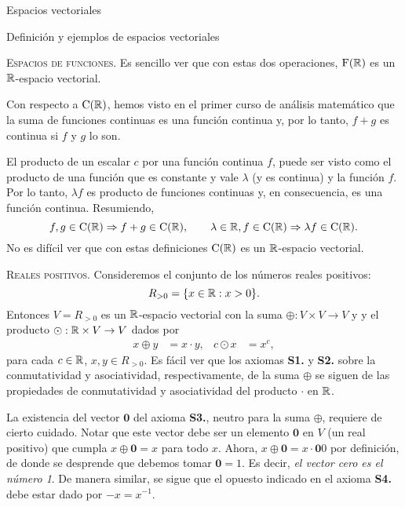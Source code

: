 \begin{chapter}{Espacios vectoriales}
\begin{section}{Definici\'on y ejemplos de espacios vectoriales}
\begin{ejemplo*}{\textsc{Espacios de funciones.}}
                Es sencillo ver que con estas dos operaciones, $\operatorname{F}(\mathbb R)$ es un $\mathbb R$-espacio vectorial.
                
                Con respecto a $\operatorname{C}(\mathbb R)$, hemos visto en el primer curso de análisis matemático  que la suma de funciones continuas es una función continua y, por lo tanto, $f+g$ es continua si $f$ y $g$ lo son.  
                
                El producto de un escalar $c$ por una función continua $f$,  puede ser visto como el producto de una función que es constante y vale $\lambda $ (y es continua) y la función $f$. Por lo tanto, $\lambda f$ es producto de funciones continuas y, en consecuencia, es una función continua.  Resumiendo,
                \begin{equation*}
                f, g \in \operatorname{C}(\mathbb R) \Rightarrow f+g \in \operatorname{C}(\mathbb R), \qquad \lambda \in \mathbb R, f \in \operatorname{C}(\mathbb R) \Rightarrow \lambda f \in \operatorname{C}(\mathbb R).
                \end{equation*}
                No es difícil ver que con estas definiciones $\operatorname{C}(\mathbb R)$  es un $\mathbb R$-espacio vectorial.
            \end{ejemplo*}
            
            
            
            \medspace
            
            \begin{ejemplo*}{\textsc{Reales positivos.}}
            Consideremos el conjunto de los números reales positivos:
            \[
            R_{>0}=\{x\in\mathbb R : x>0\}.
            \]
            Entonces $V=R_{>0}$ es un $\mathbb R$-espacio vectorial con la suma $\oplus:V\times V\to V$ y  y el producto $\odot:\mathbb R\times V\to V$ dados por
            \begin{align*}
            x\oplus y&=x\cdot y, & c\odot x&=x^c,
            \end{align*}
            para cada $c\in\mathbb R$, $x,y\in R_{>0}$.
Es fácil ver que los axiomas \textbf{S1.} y \textbf{S2.} sobre la conmutatividad y asociatividad, respectivamente, de la suma $\oplus$ se siguen de las propiedades de conmutatividad y asociatividad del producto $\cdot$ en $\mathbb R$.

La existencia del vector $\textbf{0}$ del axioma \textbf{S3.}, neutro para la suma $\oplus$, requiere de cierto cuidado. Notar que este vector debe ser un elemento $\textbf{0}$ en $V$ (un real positivo) que cumpla $x\oplus \textbf{0}=x$ para todo $x$. Ahora, $x\oplus \textbf{0}=x\cdot \textbf{0}0$ por definición, de donde se desprende que debemos tomar $\textbf{0}=1$. Es decir, \textit{el vector cero es el número 1}. De manera similar, se sigue que el opuesto indicado en el  axioma \textbf{S4.} debe estar dado por $-x=x^{-1}$.


\end{ejemplo*}
\end{section}
\end{chapter}
